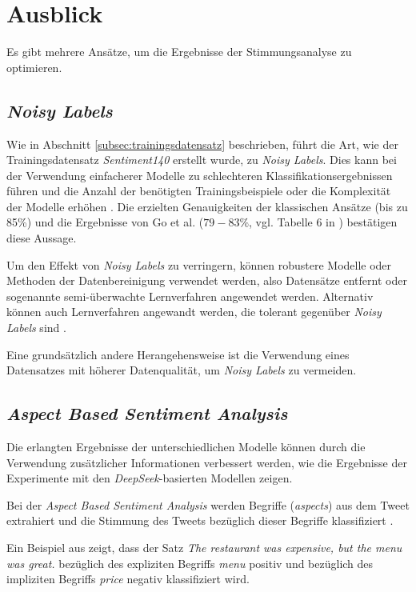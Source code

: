 \section{Ausblick}\label{sec:ausblick}

Es gibt mehrere Ansätze, um die Ergebnisse der Stimmungsanalyse zu optimieren.

\subsection{\textit{Noisy Labels}}
Wie in Abschnitt \ref{subsec:trainingsdatensatz} beschrieben, führt die Art, wie der Trainingsdatensatz \textit{Sentiment140} erstellt wurde, zu \textit{Noisy Labels}.
Dies kann bei der Verwendung einfacherer Modelle zu schlechteren Klassifikationsergebnissen führen und die Anzahl der benötigten Trainingsbeispiele oder die Komplexität der Modelle erhöhen \cite{NoisyLabel2014}.
Die erzielten Genauigkeiten der klassischen Ansätze (bis zu 85\%) und die Ergebnisse von Go et al. ($79-83\%$, vgl. Tabelle 6 in \cite{go2009twitter}) bestätigen diese Aussage.

Um den Effekt von \textit{Noisy Labels} zu verringern, können robustere Modelle oder Methoden der Datenbereinigung verwendet werden, also Datensätze entfernt oder sogenannte semi-überwachte Lernverfahren angewendet werden. Alternativ können auch Lernverfahren angewandt werden, die tolerant gegenüber \textit{Noisy Labels} sind \cite[Abschn. 3]{NoisyLabel2014}.

Eine grundsätzlich andere Herangehensweise ist die Verwendung eines Datensatzes mit höherer Datenqualität, um \textit{Noisy Labels} zu vermeiden.

\subsection{\textit{Aspect Based Sentiment Analysis}}

Die erlangten Ergebnisse der unterschiedlichen Modelle können durch die Verwendung zusätzlicher Informationen verbessert werden, wie die Ergebnisse der Experimente mit den \textit{DeepSeek}-basierten Modellen zeigen.

Bei der \textit{Aspect Based Sentiment Analysis} werden Begriffe (\textit{aspects}) aus dem Tweet extrahiert und die Stimmung des Tweets bezüglich dieser Begriffe klassifiziert \cite{Hua_2024}.

Ein Beispiel aus \cite{Hua_2024} zeigt, dass der Satz \glqq \textit{The restaurant was expensive, but the menu was great.}\grqq{} bezüglich des expliziten Begriffs \textit{menu} positiv und bezüglich des impliziten Begriffs \textit{price} negativ klassifiziert wird.

